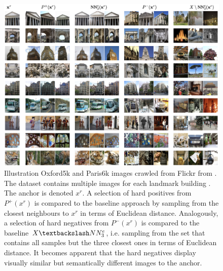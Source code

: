 \begin{figure}[h] %
    \centering
    \includegraphics[width=360pt]{images/mining_manifold_examples.png}
    \caption{Illustration Oxford5k and Paris6k images crawled from Flickr from \citet{mining_manifolds_2018}.
    The dataset contains multiple images for each landmark building \citet{manifold_dataset}.
    The anchor is denoted $x^r$.
    A selection of hard positives from $P^+(x^r)$ is compared to the 
    baseline approach by sampling from the closest neighbours to $x^r$ in 
    terms of Euclidean distance.
    Analogously, a selection of hard negatives from $P^-(x^r)$ 
    is compared to the baseline $X \textbackslash NN^e_3$, 
    i.e. sampling from the set that contains all samples but the three closest ones in 
    terms of Euclidean distance.
    It becomes apparent that the hard negatives display visually similar but 
    semantically different images to the anchor. %
    }
    \label{fig:manifold_mining_examples}
\end{figure}